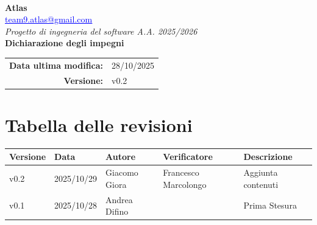 \documentclass[a4paper,12pt]{article}
\makeatletter
\newcommand{\Gruppo}{Atlas}
\newcommand{\Email}{\href{mailto:team9.atlas@gmail.com}{\textcolor{blue}{\underline{team9.atlas@gmail.com}}}}
\newcommand{\TitoloUno}{Dichiarazione degli impegni}
\newcommand{\DataModifica}{28/10/2025}
\newcommand{\LogoGruppo}{img/AtlasLogo.png} %
\newcommand{\VersioneDocumento}{v0.2} %
\makeatother
\begin{document}
\begin{titlepage}
    \centering

    \vspace*{0cm}
    \\[0.8cm]

    {\LARGE \textbf{\Gruppo}}\\[0.1cm]
    {\large \Email}\\[1.2cm]

    {\Large \textit{Progetto di ingegneria del software A.A. 2025/2026}}\\[1.5cm]

    {\Huge \textbf{\TitoloUno}}\\[.5cm]

    \begin{tabular}{rl}
        \textbf{Data ultima modifica:} & \DataModifica \\
        \textbf{Versione:} & \VersioneDocumento \\
    \end{tabular}

\end{titlepage}


\section*{Tabella delle revisioni}{
    \begin{center} 
        \begin{tabular}{|l|l|l|l|l|}
            \hline
            \textbf{Versione} & \textbf{Data} & \textbf{Autore} & \textbf{Verificatore} & \textbf{Descrizione} \\
            \hline
            \VersioneDocumento & 2025/10/29 & Giacomo Giora & Francesco Marcolongo & Aggiunta contenuti \\
            \hline
            v0.1 & 2025/10/28 & Andrea Difino & & Prima Stesura \\
            \hline
        \end{tabular}
    \end{center}
}
\end{document}
